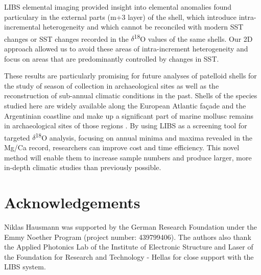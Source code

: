 \documentclass[
  authoryear,
  preprint,
  3p]{elsarticle}
\begin{document}
LIBS elemental imaging provided insight into elemental anomalies found
particulary in the external parts (m+3 layer) of the shell, which
introduce intra-incremental heterogeneity and which cannot be reconciled
with modern SST changes or SST changes recorded in the
$\delta$\textsuperscript{18}O values of the same shells. Our 2D
approach allowed us to avoid these areas of intra-increment
heterogeneity and focus on areas that are predominantly controlled by
changes in SST.

These results are particularly promising for future analyses of
patelloid shells for the study of season of collection in archaeological
sites as well as the reconstruction of sub-annual climatic conditions in
the past. Shells of the species studied here are widely available along
the European Atlantic façade and the Argentinian coastline and make up a
significant part of marine mollusc remains in archaeological sites of
those regions
\citep{Colonese2011-ab, Villagran2011-ld, Zangrando2016-yl}. By using
LIBS as a screening tool for targeted $\delta$\textsuperscript{18}O analysis,
focusing on annual minima and maxima revealed in the Mg/Ca record,
researchers can improve cost and time efficiency. This novel method will
enable them to increase sample numbers and produce larger, more in-depth
climatic studies than previously possible.

\section{Acknowledgements}\label{acknowledgements}
Niklas Hausmann was supported by the German Research Foundation 
under the Emmy Noether Program (project number: 439799406). The authors 
also thank the Applied Photonics Lab of the Institute of Electronic Structure and 
Laser of the Foundation for Research and Technology - Hellas for close support 
with the LIBS system.

\renewcommand\refname{References}

\end{document}
